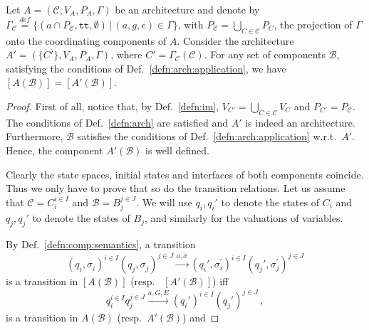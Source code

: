 \documentclass{llncs}
\newcommand{\defn}[1]{Def.~\ref{defn:#1}}
\newcommand{\cB}{\ensuremath{\mathcal{B}}}
\newcommand{\cC}{\ensuremath{\mathcal{C}}}
\newcommand{\wrt}[1][\ ]{w.r.t.#1}
\newcommand{\resp}[1][\ ]{resp.#1}
\newcommand{\bydef}[1]{\ensuremath{\stackrel{\mathit{\scriptscriptstyle def}}{#1}}}
\newcommand{\setdef}[2]{\ensuremath{\{{#1}\,|\,{#2}\}}}
\newcommand{\goesto}[2][]{\ensuremath{\xrightarrow[#1]{#2}}}
\newcommand{\true} {\ensuremath{\mathtt{t\!t}}}
\newcommand{\noop} {\ensuremath{\emptyset}} %
\newcommand{\val}[3][]{%
  \ensuremath{#1{\sigma}^{#2}_{#3}}%
}
\newcommand{\export}[1][]{\ensuremath{\varepsilon_{#1}}}
\newcommand{\valdiff}[2]{\ensuremath{#1 \triangle #2}}
\newcommand{\semopen}[1]{\ensuremath{[{#1}]}}
\begin{document}
\begin{lemma}
  \label{lem:onlyone}
  Let $A = (\cC, V_A, P_A, \Gamma)$ be an architecture and denote
  by $\Gamma_\cC \bydef{=}
%
  \setdef{
    (a \cap P_\cC, \true, \noop)
  }{
    (a, g, e) \in \Gamma
  }$, with $P_\cC = \bigcup_{C \in \cC} P_C$,
%  
  the projection of $\Gamma$ onto the coordinating components of
  $A$.  Consider the architecture $A' = (\{C'\}, V_A, P_A,
  \Gamma)$, where $C' = \Gamma_\cC(\cC)$.  For any set of
  components $\cB$, satisfying the conditions of
  \defn{arch:application}, we have
  $\semopen{A(\cB)} = \semopen{A'(\cB)}$.
\end{lemma}
%
\begin{proof}
  First of all, notice that, by \defn{im},
  $V_{C'} = \bigcup_{C \in \cC} V_C$ and $P_{C'} = P_\cC$.
  The conditions of \defn{arch} are satisfied and $A'$ is indeed
  an architecture.  Furthermore, $\cB$ satisfies the conditions
  of \defn{arch:application} \wrt $A'$.  Hence, the component
  $A'(\cB)$ is well defined.

  Clearly the state spaces, initial states and interfaces of both
  components coincide.  Thus we only have to prove that so do the
  transition relations.  Let us assume that
  $\cC = C_i^{i \in I}$ and $\cB = B_j^{j \in J}$.
  We will use $q_i, q_i'$ to denote the states of
  $C_i$ and $q_j, q_j'$ to denote the states of $B_j$,
  and similarly for the valuations of variables.

  By \defn{comp:semantics}, a transition
%
  \begin{equation}
    \label{eq:lem1:trans:sem}
    (q_i, \val{}{i})^{i \in I} (q_j, \val{}{j})^{j \in J}
    \goesto{a, \val[\tilde]{}{}}
    (q_i', \val{\prime}{i})^{i \in I}
    (q_j', \val{\prime}{j})^{j \in J}
  \end{equation}
%  
  is a transition in $\semopen{A(\cB)}$ (\resp
  $\semopen{A'(\cB)}$) iff
%
  \begin{equation}
    \label{eq:lem1:trans}
    q_i^{i \in I} q_j^{j \in J}
    \goesto{a, G, E}
    (q_i')^{i \in I} (q_j')^{j \in J}
    \,,
  \end{equation}
%
  is a transition in $A(\cB)$ (\resp $A'(\cB)$) and
%


\end{proof}
\end{document}
